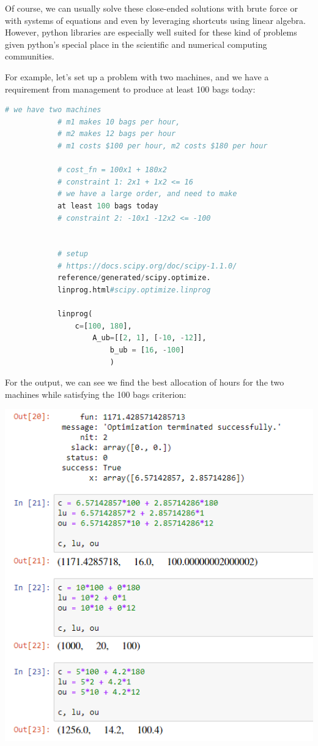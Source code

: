 \documentclass[a4paper,10pt]{extarticle}
\begin{document}
\begin{multicols}{2}
            Of course, we can usually solve these close-ended solutions with brute force or with systems of equations and even by leveraging shortcuts using linear algebra. However, python libraries are especially well suited for these kind of problems given python's special place in the scientific and numerical computing communities.

            For example, let's set up a problem with two machines, and we have a requirement from management to produce at least 100 bags today:


            \lstset{basicstyle=\tiny}
            \begin{lstlisting}[language=Python]
            # we have two machines
            # m1 makes 10 bags per hour, 
            # m2 makes 12 bags per hour
            # m1 costs $100 per hour, m2 costs $180 per hour

            # cost_fn = 100x1 + 180x2
            # constraint 1: 2x1 + 1x2 <= 16
            # we have a large order, and need to make 
            at least 100 bags today
            # constraint 2: -10x1 -12x2 <= -100


            # setup
            # https://docs.scipy.org/doc/scipy-1.1.0/
            reference/generated/scipy.optimize.
            linprog.html#scipy.optimize.linprog

            linprog(
                c=[100, 180],
                    A_ub=[[2, 1], [-10, -12]],
                        b_ub = [16, -100]
                        )
                        \end{lstlisting}

                        For the output, we can see we find the best allocation of hours for the two machines while satisfying the 100 bags criterion:

                        \includegraphics[scale=0.45]{screen5.png}


\end{multicols}
\end{document}
